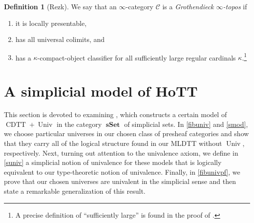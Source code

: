 \documentclass[10pt,letterpaper,cm]{nupset}
\theoremstyle{definition}
\newtheorem{definition}{Definition}[subsection]
\theoremstyle{theorem}
\theoremstyle{remark}
\newcommand{\0}{\mathbf{0}}
\newcommand{\1}{\mathbf{1}}
\newcommand{\2}{\mathbf{2}}
\DeclareMathOperator{\cdtt}{\mathrm{CDTT}}
\DeclareMathOperator{\univ}{\mathrm{Univ}}
\DeclareMathOperator{\op}{op}
\DeclareMathOperator{\sset}{\mathbf{sSet}}
\DeclareMathOperator{\set}{\mathbf{Set}}
\renewcommand{\c}{\mathscr{C}}
\newcommand{\be}{\begin{enumerate}}
\newcommand{\ee}{\end{enumerate}}
\begin{document}
\begin{definition}[Rezk]
We say that an $\infty$-category $\c$ is a \textit{Grothendieck $\infty$-topos}  if 
\be[label=(\roman*)]
\item it is locally presentable, 
\item has all universal colimits, and
\item has a $\kappa$-compact-object classifier for all sufficiently large regular cardinals $\kappa$.\footnote{A precise definition of ``sufficiently large'' is found in the proof of \cite[Proposition 6.1.6.7]{Lurie}.}
\ee
\end{definition}


\section{A simplicial model of HoTT}\label{models}

This section is devoted to examining \cite[Sections 2 and 3]{KL}, which constructs a certain model of $\cdtt  +\univ$ in the category $\sset$ of simplicial sets.
In \cref{fibuniv} and  \cref{smod}, we choose particular universes in our chosen class of presheaf categories and show that they carry all of the logical structure found in our MLDTT without $\univ$, respectively.  Next, turning out attention to the univalence axiom, we define in \cref{suniv} a simplicial notion of univalence for these models that is logically equivalent to our type-theoretic notion of univalence. Finally, in \cref{fibunivpf}, we prove that our chosen universes are univalent  in the simplicial sense and then state a remarkable generalization of this result.

\begin{comment}
This section is devoted to examining both \cite[Sections 2 and 3]{KL}  and \cite{Shul}. The former constructs a certain model of $\cdtt  +\univ$ in the category $\sset$ of simplicial sets. The latter uses this construction to show that $\cdtt  +\univ$ can be interpreted in the category of simplicial presheaves over any small elegant Reedy category $\c$. Since the trivial category $\ast$ is elegant Reedy (as will be evident) and $$\mleft[\ast^{\op}, \sset\mright] \cong \mleft[\mleft(\ast \times \varDelta\mright)^{\op}, \set\mright] \cong \sset,$$  it follows that \cite{Shul} directly generalizes \cite{KL}. Even so, it will be sufficient to take \cite{KL}, on the one hand, as our main source for several key stages of \cite{Shul} as they have exact analogues in the setting of  $\mathbf{sSet}$. Such a setting is also instructive thanks to its familiarity and geometric flavor. On the other hand, we shall take \cite{Shul} as our main source for proving that the internal universe is fibrant since its methodology here is substantially different from that of  \cite{KL}.
\end{comment}
\end{document}
